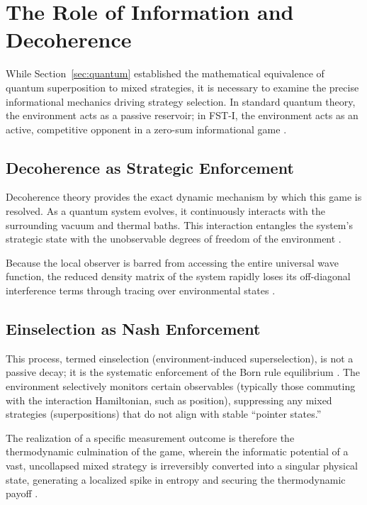 \documentclass[12pt,a4paper]{article}
\theoremstyle{remark}
\begin{document}
\section{The Role of Information and Decoherence}
\label{sec:decoherence}

While Section~\ref{sec:quantum} established the mathematical equivalence of quantum superposition to mixed strategies, it is necessary to examine the precise informational mechanics driving strategy selection. In standard quantum theory, the environment acts as a passive reservoir; in FST-I, the environment acts as an active, competitive opponent in a zero-sum informational game \citep{DynamicalOrigin2005}.

\subsection{Decoherence as Strategic Enforcement}

Decoherence theory provides the exact dynamic mechanism by which this game is resolved. As a quantum system evolves, it continuously interacts with the surrounding vacuum and thermal baths. This interaction entangles the system's strategic state with the unobservable degrees of freedom of the environment \citep{MeasurementClassical}.

Because the local observer is barred from accessing the entire universal wave function, the reduced density matrix of the system rapidly loses its off-diagonal interference terms through tracing over environmental states \citep{Lindblad2015}.

\subsection{Einselection as Nash Enforcement}

This process, termed einselection (environment-induced superselection), is not a passive decay; it is the systematic enforcement of the Born rule equilibrium \citep{Zurek2003}. The environment selectively monitors certain observables (typically those commuting with the interaction Hamiltonian, such as position), suppressing any mixed strategies (superpositions) that do not align with stable ``pointer states.''

The realization of a specific measurement outcome is therefore the thermodynamic culmination of the game, wherein the informatic potential of a vast, uncollapsed mixed strategy is irreversibly converted into a singular physical state, generating a localized spike in entropy and securing the thermodynamic payoff \citep{Lindblad2015}.
\end{document}

